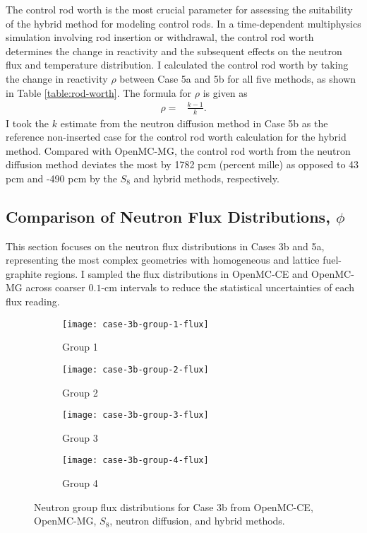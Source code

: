 The control rod worth is the most crucial parameter for assessing the suitability of the
hybrid method for modeling control rods. In a time-dependent multiphysics simulation involving rod
insertion or withdrawal, the control rod worth determines the change in reactivity and the
subsequent effects on the neutron flux and temperature distribution. I calculated the control rod
worth by taking the change in reactivity $\rho$ between Case 5a and 5b for all five methods, as
shown in Table \ref{table:rod-worth}. The formula for $\rho$ is given as
%
\begin{align}
  \rho =& \frac{k-1}{k}.
\end{align}
%
I took the $k$ estimate from the neutron diffusion method in Case 5b as the reference non-inserted
case for the control rod worth calculation for the hybrid method. Compared with OpenMC-MG, the
control rod worth from the neutron diffusion method deviates the most by 1782 pcm (percent mille)
as opposed to 43 pcm and -490 pcm by the $S_8$ and hybrid methods, respectively.

\subsection{Comparison of Neutron Flux Distributions, $\phi$}

This section focuses on the neutron flux distributions in Cases 3b and 5a, representing the most
complex geometries with homogeneous and lattice fuel-graphite regions. I sampled the flux
distributions in OpenMC-CE and OpenMC-MG across coarser $0.1$-cm intervals to reduce the
statistical uncertainties of each flux reading.

\begin{figure}[htb!]
  \centering
  \begin{subfigure}[t]{.49\textwidth}
    \centering
    \texttt{[image: case-3b-group-1-flux]}
    \caption{Group 1}
    \label{fig:c3bg1}
  \end{subfigure}
  \hfill
  \begin{subfigure}[t]{.49\textwidth}
    \centering
    \texttt{[image: case-3b-group-2-flux]}
    \caption{Group 2}
    \label{fig:c3bg2}
  \end{subfigure}
  \begin{subfigure}[t]{.49\textwidth}
    \centering
    \texttt{[image: case-3b-group-3-flux]}
    \caption{Group 3}
    \label{fig:c3bg3}
  \end{subfigure}
  \hfill
  \begin{subfigure}[t]{.49\textwidth}
    \centering
    \texttt{[image: case-3b-group-4-flux]}
    \caption{Group 4}
    \label{fig:c3bg4}
  \end{subfigure}
  \caption{Neutron group flux distributions for Case 3b from OpenMC-CE, OpenMC-MG, $S_8$, neutron
  diffusion, and hybrid methods.}
  \label{fig:c3bflux}
\end{figure}

